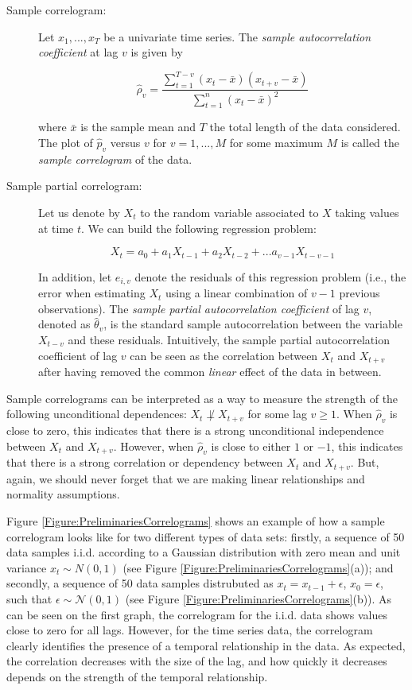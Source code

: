 \begin{description}
\item[Sample correlogram:] Let ${x_1,...,x_T}$ be a univariate time series. The \emph{sample autocorrelation coefficient} at lag $v$ is given by 

$$ \hat{\rho}_v =\frac{\sum_{t=1}^{T-v} (x_t-\bar{x})(x_{t+v}-\bar{x})}{\sum_{t=1}^{n} (x_t-\bar{x})^2}$$ 

\noindent where $\bar{x}$ is the sample mean and $T$ the total length of the data considered. The plot of $\hat{p}_v$ versus $v$ for $v=1,..., M$ for some maximum $M$ is called the \emph{sample correlogram} of the data.

\item[Sample partial correlogram:] Let us denote by $X_t$ to the random variable associated to $X$ taking values at time $t$. We can build the following regression problem:

$$ X_t = a_0 + a_1X_{t-1} + a_2X_{t-2} + ... a_{v-1}X_{t-v-1}$$

In addition, let $e_{i,v}$ denote the residuals of this regression problem (i.e., the error when estimating $X_t$ using a linear combination of $v-1$ previous observations). The \emph{sample partial autocorrelation coefficient} of lag $v$, denoted as  $\hat{\theta}_v$, is the standard sample autocorrelation between  the variable $X_{t-v}$ and these residuals. Intuitively, the sample partial autocorrelation coefficient of lag $v$ can be seen as the correlation between $X_t$ and $X_{t+v}$ after having removed the common \emph{linear} effect of the data in between.
\end{description}

Sample correlograms can be interpreted as a way to measure the strength of the following unconditional dependences: $X_t  \not\perp X_{t+v}$ for some lag $v \geq 1$.  When $\hat{\rho}_v$ is close to zero, this indicates that there is a strong unconditional independence between $X_t$ and $X_{t+v}$. However, when $\hat{\rho}_v$ is close to either $1$ or $-1$, this indicates that there is a strong correlation or dependency between $X_t$ and $X_{t+v}$. But, again, we should never forget that we are making linear relationships and normality assumptions. 

Figure \ref{Figure:PreliminariesCorrelograms} shows an example of how a sample correlogram looks like for two different types of data sets: firstly, a sequence of 50 data samples i.i.d. according to a Gaussian distribution with zero mean and unit variance $x_t\sim N(0,1)$ (see Figure \ref{Figure:PreliminariesCorrelograms}(a));  and secondly, a sequence of 50 data samples distrubuted as $x_t=x_{t-1} + \epsilon$, $x_0=\epsilon$, such that $\epsilon\sim {\mathcal N}(0,1)$ (see  Figure \ref{Figure:PreliminariesCorrelograms}(b)). As can be seen on the first graph, the correlogram for the i.i.d. data shows values close to zero for all lags. However, for the time series data, the correlogram clearly identifies the presence of a temporal relationship in the data. As expected, the correlation decreases with the size of the lag, and how quickly it decreases depends on the strength of the temporal relationship. 

